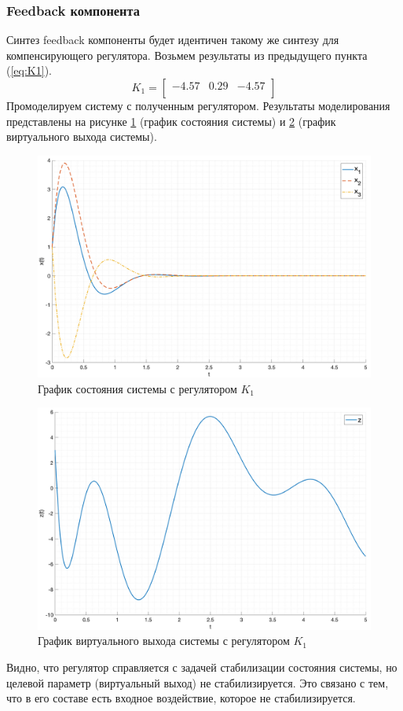 \subsubsection{Feedback компонента}
Синтез feedback компоненты будет идентичен такому же синтезу для
компенсирующего регулятора. Возьмем результаты из предыдущего пункта (\ref{eq:K1}). 
\begin{equation}
    K_1 = \begin{bmatrix}
        -4.57  & 0.29  & -4.57 \\ 
    \end{bmatrix}
\end{equation}
Промоделируем систему с полученным регулятором. Результаты моделирования 
представлены на рисунке \ref{fig:task2_K1_x} (график состояния системы) и
\ref{fig:task2_K1_z} (график виртуального выхода системы).
\begin{figure}[ht!]
    \centering
    \includegraphics[width=\textwidth]{media/plots/task2_K1_x.png}
    \caption{График состояния системы с регулятором $K_1$}
    \label{fig:task2_K1_x}
\end{figure}
\begin{figure}[ht!]
    \centering
    \includegraphics[width=\textwidth]{media/plots/task2_K1_z.png}
    \caption{График виртуального выхода системы с регулятором $K_1$}
    \label{fig:task2_K1_z}
\end{figure}
Видно, что регулятор справляется с задачей стабилизации состояния системы, но 
целевой параметр (виртуальный выход) не стабилизируется. Это связано с тем, что в его составе 
есть входное воздействие, которое не стабилизируется. 

